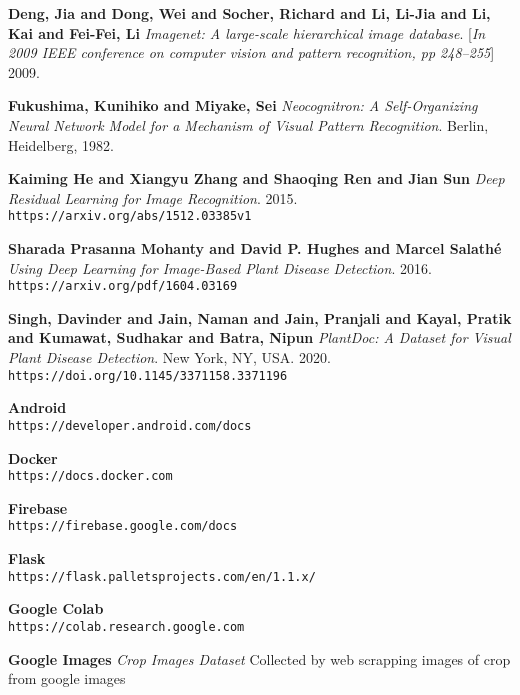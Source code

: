 \documentclass[../Report.tex]{subfiles}
\begin{document}
\begin{thebibliography}{9}

    \textbf{Deng, Jia and Dong, Wei and Socher, Richard and Li, Li-Jia and Li, Kai and Fei-Fei, Li}
    \textit{Imagenet: A large-scale hierarchical image database}. 
    [\textit{In 2009 IEEE conference on computer vision and pattern recognition, pp 248--255}] 2009.

    \textbf{Fukushima, Kunihiko and Miyake, Sei}
    \textit{Neocognitron: A Self-Organizing Neural Network Model for a Mechanism of Visual Pattern Recognition}. 
    Berlin, Heidelberg, 1982.

    \textbf{Kaiming He and Xiangyu Zhang and Shaoqing Ren and Jian Sun}
    \textit{Deep Residual Learning for Image Recognition}. 2015.
    \\\texttt{https://arxiv.org/abs/1512.03385v1}
    
    \textbf{Sharada Prasanna Mohanty and David P. Hughes and Marcel Salath{\'{e}}}
    \textit{Using Deep Learning for Image-Based Plant Disease Detection}. 2016.
    \\\texttt{https://arxiv.org/pdf/1604.03169}

    \textbf{Singh, Davinder and Jain, Naman and Jain, Pranjali and Kayal, Pratik and Kumawat, Sudhakar and Batra, Nipun}
    \textit{PlantDoc: A Dataset for Visual Plant Disease Detection}.
    New York, NY, USA. 2020.
    \\\texttt{https://doi.org/10.1145/3371158.3371196}

    \textbf{Android}
    \\\texttt{https://developer.android.com/docs}

    \textbf{Docker}
    \\\texttt{https://docs.docker.com}

    \textbf{Firebase}
    \\\texttt{https://firebase.google.com/docs}

    \textbf{Flask}
    \\\texttt{https://flask.palletsprojects.com/en/1.1.x/}

    \textbf{Google Colab}
    \\\texttt{https://colab.research.google.com}

    \textbf{Google Images}
    \textit{Crop Images Dataset} Collected by web scrapping images of crop from google images


\end{thebibliography}
\end{document}

